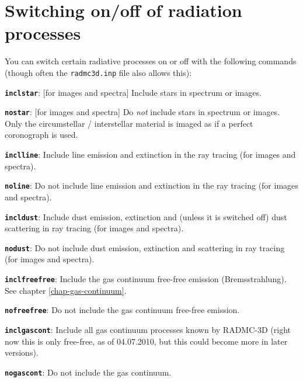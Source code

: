 \documentclass{report}
\newenvironment{options}%
  {\begin{list}{}{%
    \setlength{\topsep}{1em}%
    \setlength{\parskip}{0em}%
    \setlength{\parsep}{0em}%
    \setlength{\itemsep}{1em}%
    \setlength{\rightmargin}{0em}%
    \setlength{\leftmargin}{9em}%
    \setlength{\labelsep}{1em}%
    \setlength{\labelwidth}{6em}%
    \setlength{\itemindent}{0em}}\normalfont}%
  {\end{list}}
\begin{document}
\section{Switching on/off of radiation processes}
You can switch certain radiative processes on or off with the following
commands (though often the {\small\tt radmc3d.inp} file also allows this):
\begin{options}
\item[{\small\tt\bf inclstar}:\hfill] [for images and spectra] Include stars in
  spectrum or images.
\item[{\small\tt\bf nostar}:\hfill] [for images and spectra] Do {\em not} include stars
  in spectrum or images. Only the circumstellar / interstellar material is
  imaged as if a perfect coronograph is used.
\item[{\small\tt\bf inclline}:\hfill] Include line emission and extinction
  in the ray tracing (for images and spectra). 
\item[{\small\tt\bf noline}:\hfill] Do not include line emission and extinction
  in the ray tracing (for images and spectra).
\item[{\small\tt\bf incldust}:\hfill] Include dust emission, extinction and
  (unless it is switched off) dust scattering in ray tracing (for images and
  spectra).
\item[{\small\tt\bf nodust}:\hfill] Do not include dust emission, extinction and
  scattering in ray tracing (for images and spectra).
\item[{\small\tt\bf inclfreefree}:\hfill] Include the gas continuum free-free
  emission (Bremsstrahlung). See chapter \ref{chap-gas-continuum}.
\item[{\small\tt\bf nofreefree}:\hfill] Do not include the gas continuum
  free-free emission.
\item[{\small\tt\bf inclgascont}:\hfill] Include all gas continuum processes
  known by RADMC-3D (right now this is only free-free, as of 04.07.2010, but
  this could become more in later versions).
\item[{\small\tt\bf nogascont}:\hfill] Do not include the gas continuum.
\end{options}
\end{document}

